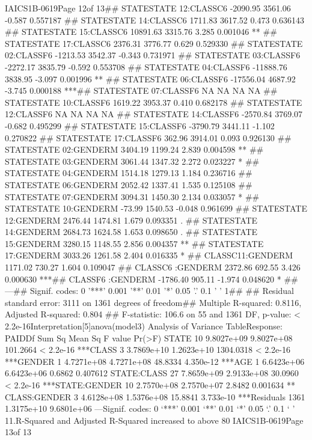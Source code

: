 IAICS1B-0619Page 12of 13## STATESTATE 12:CLASSC6   -2090.95    3561.06  -0.587 0.557187    ## STATESTATE 14:CLASSC6    1711.83    3617.52   0.473 0.636143    ## STATESTATE 15:CLASSC6   10891.63    3315.76   3.285 0.001046 ** ## STATESTATE 17:CLASSC6    2376.31    3776.77   0.629 0.529330    ## STATESTATE 02:CLASSF6   -1213.53    3542.37  -0.343 0.731971    ## STATESTATE 03:CLASSF6   -2272.17    3835.79  -0.592 0.553708    ## STATESTATE 04:CLASSF6  -11888.76    3838.95  -3.097 0.001996 ** ## STATESTATE 06:CLASSF6  -17556.04    4687.92  -3.745 0.000188 ***## STATESTATE 07:CLASSF6         NA         NA      NA       NA    ## STATESTATE 10:CLASSF6    1619.22    3953.37   0.410 0.682178    
## STATESTATE 12:CLASSF6         NA         NA      NA       NA    ## STATESTATE 14:CLASSF6   -2570.84    3769.07  -0.682 0.495299    ## STATESTATE 15:CLASSF6   -3790.79    3441.11  -1.102 0.270822    ## STATESTATE 17:CLASSF6     362.96    3914.01   0.093 0.926130    ## STATESTATE 02:GENDERM    3404.19    1199.24   2.839 0.004598 ** 
## STATESTATE 03:GENDERM    3061.44    1347.32   2.272 0.023227 *  
## STATESTATE 04:GENDERM    1514.18    1279.13   1.184 0.236716    
## STATESTATE 06:GENDERM    2052.42    1337.41   1.535 0.125108    
## STATESTATE 07:GENDERM    3094.31    1450.30   2.134 0.033057 *  
## STATESTATE 10:GENDERM     -73.99    1540.53  -0.048 0.961699    
## STATESTATE 12:GENDERM    2476.44    1474.81   1.679 0.093351 .  
## STATESTATE 14:GENDERM    2684.73    1624.58   1.653 0.098650 .  
## STATESTATE 15:GENDERM    3280.15 1148.55   2.856 0.004357 ** 
## STATESTATE 17:GENDERM    3033.26    1261.58   2.404 0.016335 *  
## CLASSC11:GENDERM         1171.02     730.27   1.604 0.109047    ## CLASSC6 :GENDERM         2372.86     692.55   3.426 0.000630 ***## CLASSF6 :GENDERM -1786.40     905.11  -1.974 0.048620 *  ## ---## Signif. codes:  0 '***' 0.001 '**' 0.01 '*' 0.05 '.' 0.1 ' ' 1## ## Residual standard error: 3111 on 1361 degrees of freedom## Multiple R-squared:  0.8116, Adjusted R-squared:  0.804 ## F-statistic: 106.6 on 55 and 1361 DF,  p-value: < 2.2e-16Interpretation[5]anova(model3)
Analysis of Variance TableResponse: PAIDDf     Sum Sq    Mean Sq   F value    Pr(>F)    STATE          10 9.8027e+09 9.8027e+08  101.2664 < 2.2e-16 ***CLASS           3 3.7869e+10 1.2623e+10 1304.0318 < 2.2e-16 ***GENDER          1 4.7271e+08 4.7271e+08   48.8334 4.350e-12 ***AGE             1 6.6423e+06 6.6423e+06    0.6862  0.407612    STATE:CLASS    27 7.8659e+09 2.9133e+08  30.0960 < 2.2e-16 ***STATE:GENDER   10 2.7570e+08 2.7570e+07    2.8482  0.001634 ** CLASS:GENDER    3 4.6128e+08 1.5376e+08   15.8841 3.733e-10 ***Residuals    1361 1.3175e+10 9.6801e+06                        ---Signif. codes:  0 ‘***’ 0.001 ‘**’ 0.01 ‘*’ 0.05 ‘.’ 0.1 ‘ ’ 11.R-Squared and Adjusted R-Squared increased to above 80%
IAICS1B-0619Page 13of 13

